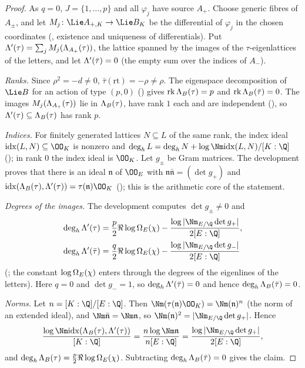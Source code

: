 \begin{proof}
As $q=0$, $J=\{1,\dots,p\}$ and all $\varphi_j$ have source $A_+$. Choose generic fibres of $A_\pm$, and
let $M_j\colon\Lie A_{+,K}\to\Lie B_K$ be the differential of $\varphi_j$ in the chosen coordinates
(, existence and uniqueness of differentials).
Put $\Lambda'(\tau)=\sum_jM_j(\Lambda_{A_+}(\tau))$, the lattice spanned by the images of the
$\tau$-eigenlattices of the letters, and let $\Lambda'(\bar\tau)=0$ (the empty sum over the indices of
$A_-$).

\emph{Ranks.} Since $\rho^2=-d\ne0$, $\bar\tau(\mathrm{rt})=-\rho\ne\rho$. The eigenspace decomposition of
$\Lie B$ for an action of type $(p,0)$ () gives
$\operatorname{rk}\Lambda_B(\tau)=p$ and $\operatorname{rk}\Lambda_B(\bar\tau)=0$. The images
$M_j(\Lambda_{A_+}(\tau))$ lie in $\Lambda_B(\tau)$, have rank $1$ each and are independent
(), so $\Lambda'(\tau)\subseteq\Lambda_B(\tau)$
has rank $p$.

\emph{Indices.} For finitely generated lattices $N\subseteq L$ of the same rank, the index ideal
$\mathrm{idx}(L,N)\subseteq\OO_K$ is nonzero and
$\deg_hL=\deg_hN+\log\Nm\mathrm{idx}(L,N)/[K:\Q]$
(); in rank $0$ the index
ideal is $\OO_K$. Let $g_\pm$ be Gram matrices. The development proves that there is an ideal $\mathfrak n$
of $\OO_E$ with $\mathfrak n\bar{\mathfrak n}=(\det g_+)$ and
$\mathrm{idx}(\liftonelat_B(\tau),\liftonelat'(\tau))=\tau(\mathfrak n)\OO_K$
(); this is the arithmetic core of the
statement.

\emph{Degrees of the images.} The development computes $\det g_\pm\ne0$ and
\begin{align*}
\deg_h\liftonelat'(\tau)&=\frac p2\Re\liftonelogOm_E(\chi)-\frac{\log|\Nm_{E/\Q}\det g_+|}{2[E:\Q]},\\
\deg_h\liftonelat'(\bar\tau)&=\frac q2\Re\liftonelogOm_E(\chi)-\frac{\log|\Nm_{E/\Q}\det g_-|}{2[E:\Q]}
\end{align*}
(; the constant
$\log\Omega_E(\chi)$ enters through the degrees of the eigenlines of the letters). Here $q=0$ and
$\det g_-=1$, so $\deg_h\Lambda'(\bar\tau)=0$ and hence $\deg_h\Lambda_B(\bar\tau)=0$.

\emph{Norms.} Let $n=[K:\Q]/[E:\Q]$. Then $\Nm(\tau(\mathfrak n)\OO_K)=\Nm(\mathfrak n)^n$
(the norm of an extended ideal), and $\Nm\bar{\mathfrak n}=\Nm\mathfrak n$,
so $\Nm(\mathfrak n)^2=|\Nm_{E/\Q}\det g_+|$. Hence
\[
\frac{\log\Nm\mathrm{idx}(\liftonelat_B(\tau),\liftonelat'(\tau))}{[K:\Q]}=\frac{n\log\Nm\mathfrak n}{n[E:\Q]}
=\frac{\log|\Nm_{E/\Q}\det g_+|}{2[E:\Q]},
\]
and $\deg_h\Lambda_B(\tau)=\frac p2\Re\log\Omega_E(\chi)$. Subtracting
$\deg_h\Lambda_B(\bar\tau)=0$ gives the claim.
\end{proof}

